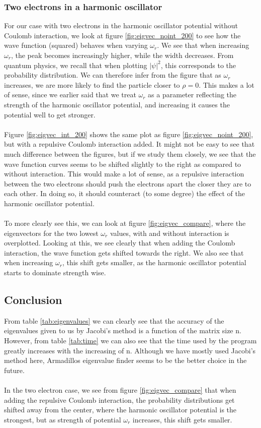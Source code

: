 \documentclass{article}
\begin{document}
\subsubsection{Two electrons in a harmonic oscillator}
For our case with two electrons in the harmonic oscillator potential without Coulomb interaction, we look at figure \ref{fig:eigvec_noint_200} to see how the wave function (squared) behaves when varying $\omega_r$. We see that when increasing $\omega_r$, the peak becomes increasingly higher, while the width decreases. From quantum physics, we recall that when plotting $|\psi|^2$, this corresponds to the probability distribution. We can therefore infer from the figure that as $\omega_r$ increases, we are more likely to find the particle closer to $\rho = 0$. This makes a lot of sense, since we earlier said that we treat $\omega_r$ as a parameter reflecting the strength of the harmonic oscillator potential, and increasing it causes the potential well to get stronger.\\\\
Figure \ref{fig:eigvec_int_200} shows the same plot as figure \ref{fig:eigvec_noint_200}, but with a repulsive Coulomb interaction added. It might not be easy to see that much difference between the figures, but if we study them closely, we see that the wave function curves seems to be shifted slightly to the right as compared to without interaction. This would make a lot of sense, as a repulsive interaction between the two electrons should push the electrons apart the closer they are to each other. In doing so, it should counteract (to some degree) the effect of the harmonic oscillator potential.\\\\
To more clearly see this, we can look at figure \ref{fig:eigvec_compare}, where the eigenvectors for the two lowest $\omega_r$ values, with and without interaction is overplotted. Looking at this, we see clearly that when adding the Coulomb interaction, the wave function gets shifted towards the right. We also see that when increasing $\omega_r$, this shift gets smaller, as the harmonic oscillator potential starts to dominate strength wise.
\subsection{Conclusion}
From table \ref{tab:eigenvalues} we can clearly see that the accuracy of the eigenvalues given to us by Jacobi's method is a function of the matrix size n. However, from table \ref{tab:time} we can also see that the time used by the program greatly increases with the increasing of n. Although we have mostly used Jacobi's method here, Armadillos eigenvalue finder seems to be the better choice in the future.\\\\
In the two electron case, we see from figure \ref{fig:eigvec_compare} that when adding the repulsive Coulomb interaction, the probability distributions get shifted away from the center, where the harmonic oscillator potential is the strongest, but as strength of potential $\omega_r$ increases, this shift gets smaller.

\end{document}
